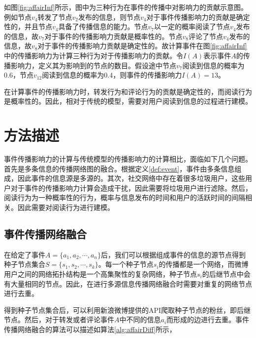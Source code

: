 如图\ref{fig:affairInf}所示，图中为三种行为在事件的传播中对影响力的贡献示意图。例如节点$v_4$转发了节点$v_2$发布的信息，则节点$v_4$对于事件传播影响力的贡献是确定性的，并且节点$v_4$具备了传播信息的能力。节点$v_7$以一定的概率阅读了节点$v_4$发布的信息，故$v_7$对于事件的传播影响力贡献是概率性的。节点$v_8$评论了节点$v_4$发布的信息，故$v_8$对于事件的传播影响力贡献是确定性的。故计算事件在图\ref{fig:affairInf}中的传播影响力为计算三种行为对于传播影响力的贡献。令$I\left(A\right)$表示事件$A$的传播影响力，定义其为影响到的节点的数目。假设途中节点$v_7$阅读到信息的概率为0.6，节点$v_12$阅读到信息的概率为0.4，则事件的传播影响力$I\left(A\right)=13$。

在计算事件的传播影响力时，转发行为和评论行为的贡献是确定性的，而阅读行为是概率性的。因此，相对于传统的模型，需要对用户阅读到信息的过程进行建模。
\section{方法描述}
\label{sec5:method}
事件传播影响力的计算与传统模型的传播影响力的计算相比，面临如下几个问题。首先是多条信息的传播网络图的融合。根据定义\ref{def:event}，事件由多条信息组成，因此事件的信息源是多源的。其次，社交网络中存在着很多垃圾用户，这些用户对于事件的传播影响力计算会造成干扰，因此需要将垃圾用户进行滤除。然后，阅读行为为一种概率性的行为，概率与信息发布的时间和用户的活跃时间的间隔相关。因此需要对阅读行为进行建模。
\subsection{事件传播网络融合}
\label{subsec5:mix}
在给定了事件$A=\{a_1, a_2, \cdots, a_n\}$后，我们可以根据组成事件的信息的源节点得到种子节点集合$S=\{s_1,s_2,\cdots,s_k\}$。每一个种子节点$s_i$的传播都是一个网络，而微博用户之间的网络拓扑结构是一个高集聚性的复杂网络，种子节点$s_i$的后继节点中会有大量相同的节点。因此，在进行多源信息传播网络融合时需要对重复的网络节点进行去重。

得到种子节点集合后，可以利用新浪微博提供的API爬取种子节点的粉丝，即后继节点。然后，对于转发或者评论事件$A$中不同的信息$a_i$而形成的边进行去重。事件传播网络融合的算法可以描述如算法\ref{alg:affairDiff}所示，

